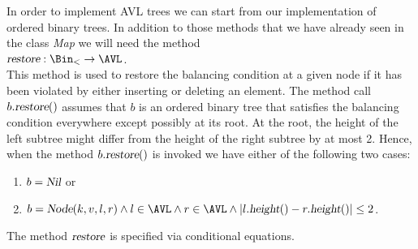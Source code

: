 In order to implement AVL trees we can start from our implementation of ordered binary trees.
In addition to those methods that we have already seen in the class \textsl{Map} we will need the method
\\[0.2cm]
\hspace*{1.3cm} $\textsl{restore}: \Bin_< \rightarrow \AVL$. 
\\[0.2cm]
This method is used to restore the balancing condition at a given node if it has been violated by
either inserting or deleting an element.
The method call $b.\textsl{restore}()$ assumes that  $b$ is an ordered binary tree that satisfies
the balancing condition everywhere except possibly at its root. 
At the root, the height of the left subtree might differ from the height of the right subtree by at
most 2.  Hence, when the method $b.\textsl{restore}()$ is invoked we have either of the following
two cases:
\begin{enumerate}
\item $b = \textsl{Nil}$ \quad or
\item $b = \textsl{Node}(k,v,l,r) \wedge l \in \AVL \wedge r \in \AVL \wedge
       |l.\textsl{height}() - r.\textsl{height}()| \leq 2$.
\end{enumerate}
The method $\textsl{restore}$ is specified via conditional equations.
